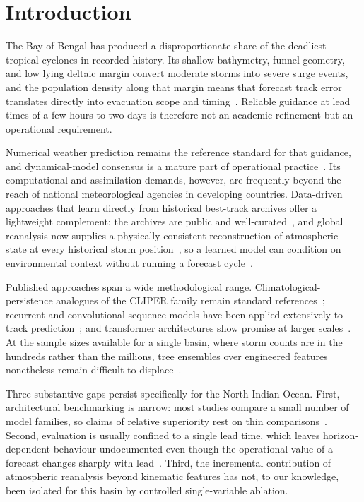 \documentclass[10pt,twocolumn,a4paper]{article}
\newcommand{\bob}{Bay of Bengal}
\begin{document}
\section{Introduction}
\label{sec:intro}
The \bob{} has produced a disproportionate share of the deadliest tropical
cyclones in recorded history. Its shallow bathymetry, funnel geometry, and low
lying deltaic margin convert moderate storms into severe surge events, and the
population density along that margin means that forecast track error translates
directly into evacuation scope and
timing~\cite{worldbank2007sidr,paul2013post,dube2009storm}. Reliable guidance at
lead times of a few hours to two days is therefore not an academic refinement but
an operational requirement.

Numerical weather prediction remains the reference standard for that guidance,
and dynamical-model consensus is a mature part of operational
practice~\cite{goerss2000tropical,goerss2004tropical}. Its computational and
assimilation demands, however, are frequently beyond the reach of national
meteorological agencies in developing countries. Data-driven approaches that
learn directly from historical best-track archives offer a lightweight
complement: the archives are public and
well-curated~\cite{knapp2010ibtracs,gahtan2024ibtracs}, and global reanalysis now
supplies a physically consistent reconstruction of atmospheric state at every
historical storm position~\cite{hersbach2023era5}, so a learned model can
condition on environmental context without running a forecast
cycle~\cite{giffard2020tropical,kumar2024machine}.

Published approaches span a wide methodological range. Climatological-persistence
analogues of the CLIPER family remain standard
references~\cite{neumann1972alternative,aberson1998five}; recurrent and
convolutional sequence models have been applied extensively to track
prediction~\cite{lian2020novel,alemany2019predicting,rahman2025tropical}; and
transformer architectures show promise at larger
scales~\cite{qu2025accurate}. At the sample sizes available for a single basin,
where storm counts are in the hundreds rather than the millions, tree ensembles
over engineered features nonetheless remain difficult to
displace~\cite{grinsztajn2022tree,ganaie2022ensemble}.

Three substantive gaps persist specifically for the North Indian Ocean. First,
architectural benchmarking is narrow: most studies compare a small number of
model families, so claims of relative superiority rest on thin
comparisons~\cite{kar2021tropical,hossain2021track}. Second, evaluation is
usually confined to a single lead time, which leaves horizon-dependent behaviour
undocumented even though the operational value of a forecast changes sharply with
lead~\cite{kumar2024machine}. Third, the incremental contribution of atmospheric
reanalysis beyond kinematic features has not, to our knowledge, been isolated for
this basin by controlled single-variable ablation.
\end{document}
